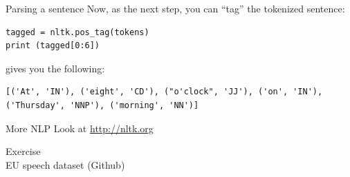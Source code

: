 \documentclass{beamer}
\begin{document}
\begin{frame}[fragile]{Parsing a sentence}
Now, as the next step, you can ``tag'' the tokenized sentence:
\begin{lstlisting}
tagged = nltk.pos_tag(tokens)
print (tagged[0:6])
\end{lstlisting}
gives you the following:
\begin{lstlisting}
[('At', 'IN'), ('eight', 'CD'), ("o'clock", 'JJ'), ('on', 'IN'),
('Thursday', 'NNP'), ('morning', 'NN')]
\end{lstlisting}


\end{frame}


\begin{frame}{More NLP}
\Huge{Look at \url{http://nltk.org}}

\end{frame}





\begin{frame}[plain]
Exercise
\\
EU speech dataset (Github)
\end{frame}
\end{document}
